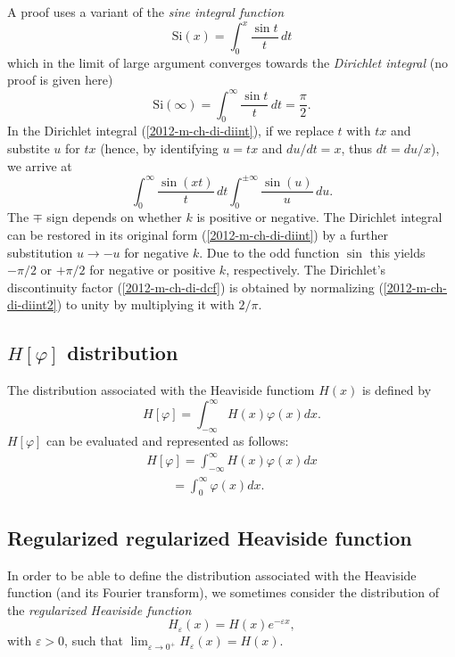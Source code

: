 {\color{OliveGreen}
\bproof
A proof uses a variant \cite{maor1998}
of the {\em sine integral function}
\begin{equation}
\textrm{Si}(x) = \int_0^x \frac{\sin t}{t} \,dt
\end{equation}
which in the limit of large argument converges towards
the {\em Dirichlet integral}   (no proof is given here)
\begin{equation}
\textrm{Si}(\infty ) = \int_0^\infty  \frac{\sin t}{t} \,dt= \frac{\pi}{2}.
\label{2012-m-ch-di-diint}
\end{equation}
In the Dirichlet integral (\ref{2012-m-ch-di-diint}), if we
replace $t$ with $tx$ and
substite $u$ for $tx$ (hence, by identifying
$u=tx$ and $du/dt = x$, thus $dt = du/x$), we arrive at
\begin{equation}
\int_0^\infty  \frac{\sin (xt)}{t} \,dt
\int_0^{\pm \infty}  \frac{\sin (u)}{u} \,du
.
\label{2012-m-ch-di-diint2}
\end{equation}
The $\mp$ sign depends on whether $k$ is positive or negative.
The Dirichlet integral can be restored
in its original form (\ref{2012-m-ch-di-diint})
by a further substitution $u \rightarrow -u$ for negative $k$.
Due to the odd function $\sin$ this
yields $-\pi /2$ or $+ \pi /2$ for negative or positive $k$, respectively.
The Dirichlet's discontinuity factor (\ref{2012-m-ch-di-dcf})
is obtained by normalizing (\ref{2012-m-ch-di-diint2}) to unity
by multiplying  it with $2/\pi$.
\eproof
}

\subsection{$H  \left[ \varphi \right]$ distribution}
The distribution associated with the Heaviside functiom $H(x)$ is defined by
\begin{equation}
H \left[ \varphi \right] =
\int_{-\infty}^\infty  H(x)  \varphi(x) dx.
 \end{equation}
$H  \left[ \varphi \right]$
can be evaluated and represented as follows:
\begin{equation}
\begin{split}
H  \left[ \varphi \right]
=
\int_{-\infty}^\infty  H(x) \varphi(x) dx
\\
\qquad
=
\int_{0}^\infty      \varphi(x) dx
.
\end{split}
\end{equation}

\subsection{Regularized regularized Heaviside function}
In order to be able to define the distribution associated with the Heaviside function (and its Fourier transform), we sometimes
consider the distribution of the {\em regularized Heaviside function}
\begin{equation}
H_\varepsilon (x) =H(x)e^{-\varepsilon x},
\label{2012-m-ch-di-rhfun}
\end{equation}
 with $\varepsilon >0$,
such that $\lim_{\varepsilon \rightarrow 0^+}  H_\varepsilon (x) =H (x)$.



